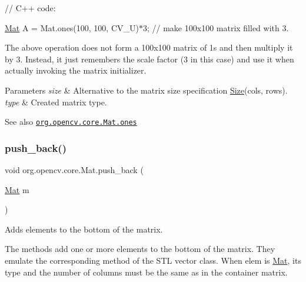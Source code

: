 {\ttfamily }

{\ttfamily // C++ code\+:}

{\ttfamily }

{\ttfamily }

{\ttfamily \mbox{\hyperlink{classorg_1_1opencv_1_1core_1_1_mat}{Mat}} A = Mat.\+ones(100, 100, C\+V\+\_\+U)$\ast$3; // make 100x100 matrix filled with 3.}

{\ttfamily }

{\ttfamily }

{\ttfamily The above operation does not form a 100x100 matrix of 1\textquotesingle{}s and then multiply it by 3. Instead, it just remembers the scale factor (3 in this case) and use it when actually invoking the matrix initializer. }


\begin{DoxyParams}{Parameters}
{\em size} & Alternative to the matrix size specification {\ttfamily \mbox{\hyperlink{classorg_1_1opencv_1_1core_1_1_size}{Size}}(cols, rows)}. \\
\hline
{\em type} & Created matrix type.\\
\hline
\end{DoxyParams}
\begin{DoxySeeAlso}{See also}
\href{http://docs.opencv.org/modules/core/doc/basic_structures.html#mat-ones}{\tt org.\+opencv.\+core.\+Mat.\+ones} 
\end{DoxySeeAlso}
\mbox{\label{classorg_1_1opencv_1_1core_1_1_mat_a137ee1d0feab4d3db45755e2b6d46c91}} 
\subsubsection{\texorpdfstring{push\+\_\+back()}{push\_back()}}
{\footnotesize\ttfamily void org.\+opencv.\+core.\+Mat.\+push\+\_\+back (\begin{DoxyParamCaption}\item[{\mbox{\hyperlink{classorg_1_1opencv_1_1core_1_1_mat}{Mat}}}]{m }\end{DoxyParamCaption})}

Adds elements to the bottom of the matrix.

The methods add one or more elements to the bottom of the matrix. They emulate the corresponding method of the S\+TL vector class. When {\ttfamily elem} is {\ttfamily \mbox{\hyperlink{classorg_1_1opencv_1_1core_1_1_mat}{Mat}}}, its type and the number of columns must be the same as in the container matrix.


